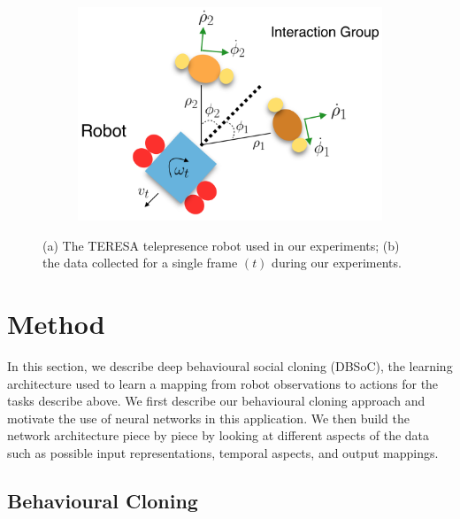 \documentclass[letterpaper, 10 pt, conference]{ieeeconf}
\begin{document}
\begin{figure}[tbh]
\begin{subfigure}[b]{0.35\columnwidth}
    \caption{}
    \label{fig:robot}
  \end{subfigure}
  \begin{subfigure}[b]{0.35\columnwidth}

    \includegraphics[scale = 0.19]{images/data.png}
  \vspace{5mm}
    \caption{}
       \label{fig:data-pic}
  \end{subfigure} 

  \caption{(a) The TERESA telepresence robot used in our experiments; (b) the data collected for a single frame $(t)$ during our experiments.}

    \vspace{-2mm}
  \label{fig:data_robot}
  \end{figure}

\section{Method}
 In this section, we describe deep behavioural social cloning (DBSoC), the learning architecture used to learn a mapping from robot observations to actions for the tasks describe above.  We first describe our behavioural cloning approach and motivate the use of neural networks in this application. We then build the network architecture piece by piece by looking at different aspects of the data such as possible input representations, temporal aspects, and output mappings. 

\subsection{Behavioural Cloning}
\end{document}

